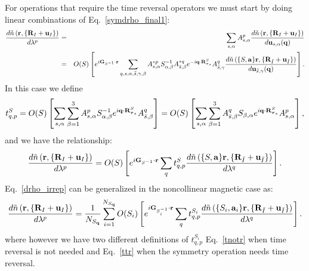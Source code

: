 \documentclass[12pt,a4paper,twoside]{report}
\begin{document}
For operations that require the time reversal operators we must start by doing linear combinations of 
Eq.~\ref{symdrho_final1}:
\begin{eqnarray}
{d \tilde n\left({\bf r}, \{{\bf R}_I + {\bf u}_I\}\right)
\over d \lambda^p}&=&
\sum_{s,\alpha} A^p_{s,\alpha}
{d \tilde n\left({\bf r}, \{{\bf R}_I + {\bf u}_I\}\right)
\over d {\bf u}_{s,\alpha}({\bf q})} 
\nonumber \\ 
&=& O(S)\left[ e^{i{\bf G}_{S^{-1}} \cdot {\bf r}} \sum_{q,s,\alpha,\bar{\bar s}, \gamma, \beta} 
A^{*p}_{s,\alpha} S^{-1}_{\alpha,\beta} 
A^{*q}_{\bar s,\beta} e^{-i{\bf q}\cdot {\bf R}^S_{{\boldsymbol{\tau}_s}}}
A^{q}_{\bar {\bar s},\gamma}
{d \tilde n\left(\{S,{\bf a}\} {\bf r}, \{{\bf R}_{\bar I} + {\bf u}_{\bar I}\}\right)
\over d {\bf u}_{\bar{\bar s},\gamma} ({\bf q})} \right].
\label{symdrho_final_irrep1} \nonumber \\
\end{eqnarray}
In this case we define
\begin{equation}
t_{q,p}^S= O(S)\left[
\sum_{s,\alpha}
\sum_{\beta=1}^3 A^p_{s,\alpha} S^{-1}_{\alpha,\beta} e^{i{\bf q}\cdot {\bf R}^S_{{\boldsymbol{\tau}_s}}} A^{q}_{\bar s,\beta}\right] = O(S) \left[\sum_{s,\alpha}
\sum_{\beta=1}^3 A^{q}_{\bar s,\beta} S_{\beta,\alpha} e^{i{\bf q}\cdot {\bf R}^S_{{\boldsymbol{\tau}_s}}} A^p_{s,\alpha}\right],
\label{ttr}
\end{equation}
and we have the relationship:
\begin{equation}
{d \tilde n\left({\bf r}, \{{\bf R}_I + {\bf u}_I\}\right) \over d \lambda^p} = O(S) \left[ e^{i{\bf G}_{S^{-1}} \cdot {\bf r}}
\sum_q t_{q,p}^S {d \tilde n\left(\{S,{\bf a}\} {\bf r}, \{{\bf R}_{\bar I} + {\bf u}_{\bar I}\}\right) \over d \lambda^q}\right]. 
\end{equation}
Eq.~\ref{drho_irrep} can be generalized
in the noncollinear magnetic case as:
\begin{equation}
{d \tilde n\left({\bf r}, \{{\bf R}_I + {\bf u}_I\}\right) \over d \lambda^p} = {1\over N_{S_{\bf q}}} \sum_{i=1}^{N_{S_{\bf q}}} O(S_i)\left[ e^{i{\bf G}_{S_i^{-1}} \cdot {\bf r}}
\sum_q t_{q,p}^{S_i} {d \tilde n\left(\{S_i,{\bf a}_i\} {\bf r}, \{{\bf R}_{\bar I} + {\bf u}_{\bar I}\}\right) \over d \lambda^q} \right].
\label{drho_irrep_1}
\end{equation}
where however we have two different definitions of $t_{q,p}^{S_i}$ Eq.~\ref{tnotr} when time reversal is not needed and Eq.~\ref{ttr} when the symmetry operation needs time reversal.
\end{document}

